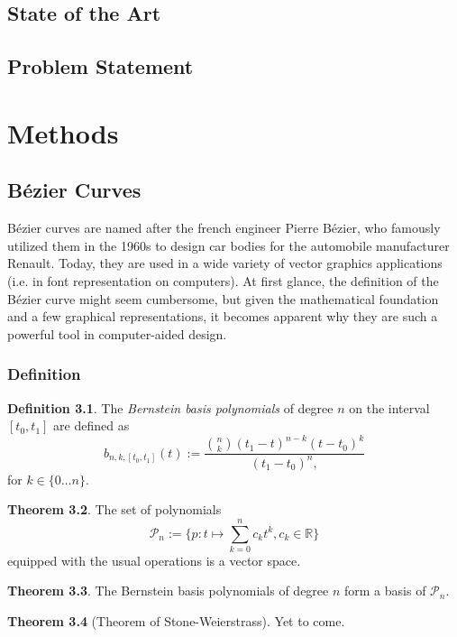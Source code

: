 \documentclass[a4paper, 11pt]{report}
\renewcommand{\emph}[1]{\textit{#1}}
\theoremstyle{definition}
\newtheorem{definition}{Definition}[section]
\newtheorem{theorem}[definition]{Theorem}
\begin{document}
\section{State of the Art}
\section{Problem Statement}

\chapter{Methods}
\section{Bézier Curves}
Bézier curves are named after the french engineer Pierre Bézier, who famously utilized them in the 1960s to design car bodies for the automobile manufacturer Renault. Today, they are used in a wide variety of vector graphics applications (i.e. in font representation on computers). At first glance, the definition of the Bézier curve might seem cumbersome, but given the mathematical foundation and a few graphical representations, it becomes apparent why they are such a powerful tool in computer-aided design.

\subsection{Definition}
\begin{definition}
	The \emph{Bernstein basis polynomials} of degree $n$ on the interval $[t_0,t_1]$ are defined as
	\begin{equation}\label{bernsteinbasisdef}
		b_{n,k,[t_0, t_1]}(t) := \frac{\binom{n}{k} (t_1-t)^{n-k}(t-t_0)^k}{(t_1-t_0)^n,}
	\end{equation}
	for $k \in \{0\dots n\}$.
\end{definition}

\begin{theorem}
	The set of polynomials
		$$\mathcal{P}_n := \{ p : t \mapsto \sum_{k=0}^n c_k t^k, c_k \in \mathbb{R}\}$$
	equipped with the usual operations is a vector space.
\end{theorem}

\begin{theorem}
	The Bernstein basis polynomials of degree $n$ form a basis of $\mathcal{P}_n$.
\end{theorem}

\begin{theorem}[Theorem of Stone-Weierstrass]
	Yet to come.
\end{theorem}
\end{document}
